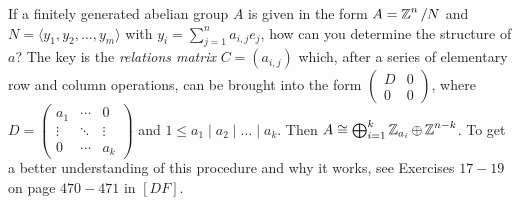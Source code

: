 \documentclass[11pt]{book}
\theoremstyle{definition}   \newtheorem{defn}[counter]{Definition} %
\newcommand{\mymatrix}[2]{\left( \begin{array}{#1} #2 \end{array} \right)}
\newcommand{\gen}[1]{\langle #1 \rangle}   \newcommand{\stab}[2]{\tn{Stab}_{#1}(#2)}   \newcommand{\fix}[2]{\tn{Fix}_{#1}(#2)}   \newcommand{\op}{^{\tn{op}}}
\newcommand{\vs}{\vspace{8pt}}
\numberwithin{counter}{chapter}
\begin{document}
\noindent {} If a finitely generated abelian group $A$ is given in the form $A = \operatorname{\mathbb{Z}}^n/N$ and $N = \gen{y_1, y_2,\dots, y_m}$ with $y_i = \sum_{j=1}^n a_{i,j} e_j$, how can you determine the structure of $a$? The key is the \emph{relations matrix} $C = (a_{i,j})$ which, after a series of elementary row and column operations, can be brought into the form $\mymatrix{cc}{D & 0 \\ 0 & 0}$, where $D = \mymatrix{ccc}{a_1 & \cdots & 0 \\ \vdots & \ddots & \vdots \\ 0 & \cdots & a_k}$ and $1 \leq a_1 \mid a_2 \mid \dots \mid a_k$. Then $A \cong \bigoplus_{i=1}^k \operatorname{\mathbb{Z}}_{a_i} \oplus \operatorname{\mathbb{Z}}^{n-k}$. To get a better understanding of this procedure and why it works, see Exercises $17-19$ on page $470-471$ in $[DF]$.

\vs
\end{document}
